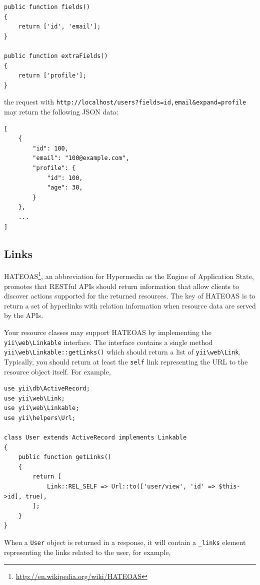 \lstset{language=php}\begin{lstlisting}
public function fields()
{
    return ['id', 'email'];
}

public function extraFields()
{
    return ['profile'];
}
\end{lstlisting}
the request with \lstinline|http://localhost/users?fields=id,email&expand=profile| may return the following JSON data:

\lstset{language=php}\begin{lstlisting}
[
    {
        "id": 100,
        "email": "100@example.com",
        "profile": {
            "id": 100,
            "age": 30,
        }
    },
    ...
]
\end{lstlisting}
\subsection{Links \label{rest-resources.md::links}}
HATEOAS\footnote{\url{http://en.wikipedia.org/wiki/HATEOAS}}, an abbreviation for Hypermedia as the Engine of Application State,
promotes that RESTful APIs should return information that allow clients to discover actions supported for the returned
resources. The key of HATEOAS is to return a set of hyperlinks with relation information when resource data are served
by the APIs.

Your resource classes may support HATEOAS by implementing the \texttt{yii{\allowbreak{}\textbackslash}web{\allowbreak{}\textbackslash}Linkable} interface. The interface
contains a single method \texttt{yii{\allowbreak{}\textbackslash}web{\allowbreak{}\textbackslash}Linkable\allowbreak{}::\allowbreak{}getLinks()} which should return a list of \texttt{yii{\allowbreak{}\textbackslash}web{\allowbreak{}\textbackslash}Link}.
Typically, you should return at least the \lstinline|self| link representing the URL to the resource object itself. For example,

\lstset{language=php}\begin{lstlisting}
use yii\db\ActiveRecord;
use yii\web\Link;
use yii\web\Linkable;
use yii\helpers\Url;

class User extends ActiveRecord implements Linkable
{
    public function getLinks()
    {
        return [
            Link::REL_SELF => Url::to(['user/view', 'id' => $this->id], true),
        ];
    }
}
\end{lstlisting}
When a \lstinline|User| object is returned in a response, it will contain a \lstinline|_links| element representing the links related
to the user, for example,

